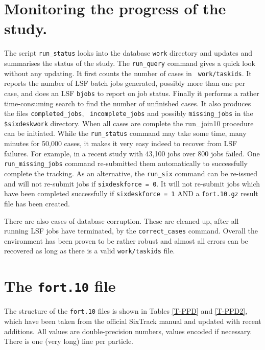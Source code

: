 \documentclass{cernatsnote}
\begin{document}
\section{Monitoring the progress of the study.} \label{sec:status} The script
{\tt run\_status} looks into the database {\tt work} directory and updates and
summarises the status of the study. The {\tt run\_query} command gives a quick
look without any updating. It first counts the number of cases in {\tt
work/taskids}.  It reports the number of LSF batch jobs generated, possibly
more than one per case, and does an LSF {\tt bjobs} to report on job status.
Finally it performs a rather time-consuming search to find the number of
unfinished cases.  It also produces the files {\tt completed\_jobs}, {\tt
incomplete\_jobs} and possibly {\tt missing\_jobs} in the {\tt \$sixdeskwork}
directory.  When all cases are complete the {run\_join10} procedure can be
initiated. While the {\tt run\_status} command may take some time, many minutes
for 50,000 cases, it makes it very easy indeed to recover from LSF failures.
For example, in a recent study with 43,100 jobs over 800 jobs failed. One {\tt
run\_missing\_jobs} command re-submitted them automatically to successfully
complete the tracking.  As an alternative, the {\tt run\_six} command can be
re-issued and will not re-submit jobs if {\tt sixdeskforce = 0}. It will not
re-submit jobs which have been completed successfully if {\tt sixdeskforce = 1}
AND a {\tt fort.10.gz} result file has been created.

There are also cases of database corruption. These are cleaned up, after all
running LSF jobs have terminated, by the {\tt correct\_cases} command. Overall
the environment has been proven to be rather robust and almost all errors can
be recovered as long as there is a valid {\tt work/taskids} file.

\section{The {\tt fort.10} file}
\label{sec:fort10}
The structure of the {\tt fort.10} files is shown in Tables \ref{T-PPD} and
\ref{T-PPD2}, which have been taken from the official SixTrack manual
\cite{SixTrack} and updated with recent additions.  All values are
double-precision numbers, values encoded if necessary.  There is one (very
long) line per particle.

 \setcounter{dst}{0}
\end{document}
